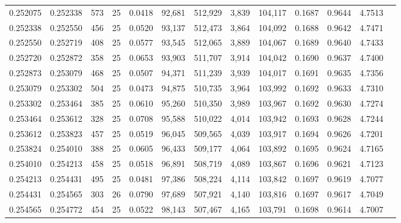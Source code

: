 \begin{tabular}{rrrrrrrrrrrrr}
0.252075 & 0.252338 &   573 &  25 &                                     0.0418 &  92,681 & 512,929 &   3,839 & 104,117 & 0.1687 & 0.9644 & 4.7513 \\
0.252338 & 0.252550 &   456 &  25 &                                     0.0520 &  93,137 & 512,473 &   3,864 & 104,092 & 0.1688 & 0.9642 & 4.7471 \\
0.252550 & 0.252719 &   408 &  25 &                                     0.0577 &  93,545 & 512,065 &   3,889 & 104,067 & 0.1689 & 0.9640 & 4.7433 \\
0.252720 & 0.252872 &   358 &  25 &                                     0.0653 &  93,903 & 511,707 &   3,914 & 104,042 & 0.1690 & 0.9637 & 4.7400 \\
0.252873 & 0.253079 &   468 &  25 &                                     0.0507 &  94,371 & 511,239 &   3,939 & 104,017 & 0.1691 & 0.9635 & 4.7356 \\
0.253079 & 0.253302 &   504 &  25 &                                     0.0473 &  94,875 & 510,735 &   3,964 & 103,992 & 0.1692 & 0.9633 & 4.7310 \\
0.253302 & 0.253464 &   385 &  25 &                                     0.0610 &  95,260 & 510,350 &   3,989 & 103,967 & 0.1692 & 0.9630 & 4.7274 \\
0.253464 & 0.253612 &   328 &  25 &                                     0.0708 &  95,588 & 510,022 &   4,014 & 103,942 & 0.1693 & 0.9628 & 4.7244 \\
0.253612 & 0.253823 &   457 &  25 &                                     0.0519 &  96,045 & 509,565 &   4,039 & 103,917 & 0.1694 & 0.9626 & 4.7201 \\
0.253824 & 0.254010 &   388 &  25 &                                     0.0605 &  96,433 & 509,177 &   4,064 & 103,892 & 0.1695 & 0.9624 & 4.7165 \\
0.254010 & 0.254213 &   458 &  25 &                                     0.0518 &  96,891 & 508,719 &   4,089 & 103,867 & 0.1696 & 0.9621 & 4.7123 \\
0.254213 & 0.254431 &   495 &  25 &                                     0.0481 &  97,386 & 508,224 &   4,114 & 103,842 & 0.1697 & 0.9619 & 4.7077 \\
0.254431 & 0.254565 &   303 &  26 &                                     0.0790 &  97,689 & 507,921 &   4,140 & 103,816 & 0.1697 & 0.9617 & 4.7049 \\
0.254565 & 0.254772 &   454 &  25 &                                     0.0522 &  98,143 & 507,467 &   4,165 & 103,791 & 0.1698 & 0.9614 & 4.7007 \\

\end{tabular}

